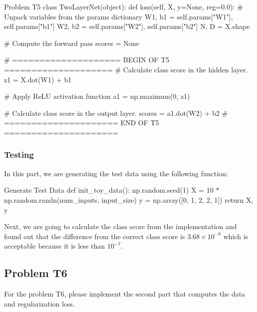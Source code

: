 \documentclass[12pt, a4paper]{article}
\begin{document}
                \begin{codeblock}{Problem T5}
                    class TwoLayerNet(object):
                        def loss(self, X, y=None, reg=0.0):
                            # Unpack variables from the params dictionary
                            W1, b1 = self.params["W1"], self.params["b1"]
                            W2, b2 = self.params["W2"], self.params["b2"]
                            N, D = X.shape

                            # Compute the forward pass
                            scores = None

                            # ==================== BEGIN OF T5 ====================
                            # Calculate class score in the hidden layer.
                            z1 = X.dot(W1) + b1

                            # Apply ReLU activation function
                            a1 = np.maximum(0, z1)

                            # Calculate class score in the output layer.
                            scores = a1.dot(W2) + b2
                            # ===================== END OF T5 =====================
                \end{codeblock}

    \pagebreak

            \subsubsection{Testing}
                In this part, we are generating the test data using the following function:
                \begin{codeblock}{Generate Test Data}
                    def init_toy_data():
                        np.random.seed(1)
                        X = 10 * np.random.randn(num_inputs, input_size)
                        y = np.array([0, 1, 2, 2, 1])
                        return X, y
                \end{codeblock}

                Next, we are going to calculate the class score from the implementation and found out that the difference from the correct class score is $3.68 \times {10}^{-8}$ which is acceptable because it is less than ${10}^{-7}$.

    \pagebreak

        \subsection{Problem T6}
            For the problem T6, please implement the second part that computes the data and regularization loss.
\end{document}
